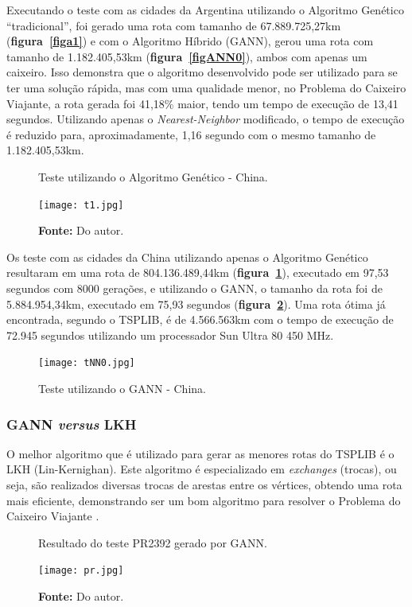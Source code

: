 \documentclass[12pt,openright,a4paper,twoside]{tcc}
\begin{document}
		Executando o teste com as cidades da Argentina utilizando o Algoritmo Genético ``tradicional'', foi gerado uma rota com tamanho de 67.889.725,27km (\textbf{figura~\ref{figa1}}) e com o Algoritmo Híbrido (GANN), gerou uma rota com tamanho de 1.182.405,53km (\textbf{figura~\ref{figANN0}}), ambos com apenas um caixeiro. Isso demonstra que o algoritmo desenvolvido pode ser utilizado para se ter uma solução rápida, mas com uma qualidade menor, no Problema do Caixeiro Viajante, a rota gerada foi 41,18\% maior, tendo um tempo de execução de 13,41 segundos. Utilizando apenas o \textit{Nearest-Neighbor} modificado, o tempo de execução é reduzido para, aproximadamente, 1,16 segundo com o mesmo tamanho de 1.182.405,53km.

   		\begin{figure}[h]
			\centering
            \caption{Teste utilizando o Algoritmo Genético - China.}
	        \texttt{[image: t1.jpg]}
	        \caption*{\textbf{Fonte:} Do autor.}
	        \label{figt1}
   		\end{figure}

        Os teste com as cidades da China utilizando apenas o Algoritmo Genético resultaram em uma rota de 804.136.489,44km (\textbf{figura~\ref{figt1}}), executado em 97,53 segundos com 8000 gerações, e utilizando o GANN, o tamanho da rota foi de 5.884.954,34km, executado em 75,93 segundos (\textbf{figura~\ref{figtNN0}}). Uma rota ótima já encontrada, segundo o TSPLIB, é de 4.566.563km com o tempo de execução de 72.945 segundos utilizando um processador Sun Ultra 80 450 MHz.
        \begin{figure}[h]
            \centering
            \caption{Teste utilizando o GANN - China.}
            \texttt{[image: tNN0.jpg]}
            \label{figtNN0}
        \end{figure}

        
   		\subsubsection{GANN \textit{versus} LKH}

		O melhor algoritmo que é utilizado para gerar as menores rotas do TSPLIB é o LKH (Lin-Kernighan). Este algoritmo é especializado em \textit{exchanges} (trocas), ou seja, são realizados diversas trocas de arestas entre os vértices, obtendo uma rota mais eficiente, demonstrando ser um bom algoritmo para resolver o Problema do Caixeiro Viajante \cite{LKH}. 

		\begin{figure}[h]
			\centering
            \caption{Resultado do teste PR2392 gerado por GANN.}
		    \texttt{[image: pr.jpg]}
		    \caption*{\textbf{Fonte:} Do autor.}
		    \label{figpa}
		\end{figure}
\end{document}
